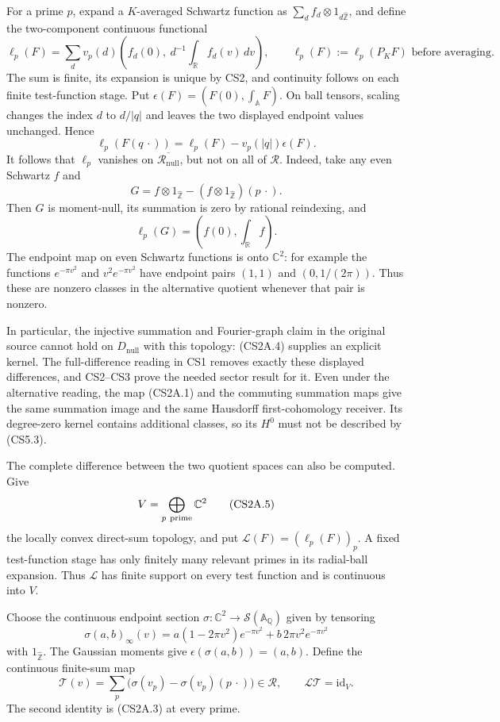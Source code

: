 For a prime \(p\), expand a \(K\)-averaged Schwartz function as
\(\sum_d f_d\otimes1_{d\widehat{\mathbb Z}}\), and define the
two-component continuous functional \[
\ell_p(F)=\sum_d v_p(d)
\left(f_d(0),\ d^{-1}\int_{\mathbb R}f_d(v)\,dv\right),
\qquad \ell_p(F):=\ell_p(P_KF)
\text{ before averaging.}
\tag{CS2A.2}
\] The sum is finite, its expansion is unique by CS2, and continuity
follows on each finite test-function stage. Put
\(\epsilon(F)=(F(0),\int_{\mathbb A}F)\). On ball tensors, scaling
changes the index \(d\) to \(d/|q|\) and leaves the two displayed
endpoint values unchanged. Hence \[
\ell_p(F(q\,\cdot))
=\ell_p(F)-v_p(|q|)\epsilon(F).
\tag{CS2A.3}
\] It follows that \(\ell_p\) vanishes on
\(\overline{\mathcal R_{\mathrm{null}}}\), but not on all of
\(\mathcal R\). Indeed, take any even Schwartz \(f\) and \[
G=f\otimes1_{\widehat{\mathbb Z}}
-(f\otimes1_{\widehat{\mathbb Z}})(p\,\cdot).
\] Then \(G\) is moment-null, its summation is zero by rational
reindexing, and \[
\ell_p(G)=\left(f(0),\int_{\mathbb R}f\right).
\tag{CS2A.4}
\] The endpoint map on even Schwartz functions is onto \(\mathbb C^2\):
for example the functions \(e^{-\pi v^2}\) and \(v^2e^{-\pi v^2}\) have
endpoint pairs \((1,1)\) and \((0,1/(2\pi))\). Thus these are nonzero
classes in the alternative quotient whenever that pair is nonzero.

In particular, the injective summation and Fourier-graph claim in the
original source cannot hold on \(D_{\mathrm{null}}\) with this topology:
(CS2A.4) supplies an explicit kernel. The full-difference reading in CS1
removes exactly these displayed differences, and CS2--CS3 prove the
needed sector result for it. Even under the alternative reading, the map
(CS2A.1) and the commuting summation maps give the same summation image
and the same Hausdorff first-cohomology receiver. Its degree-zero kernel
contains additional classes, so its \(H^0\) must not be described by
(CS5.3).

The complete difference between the two quotient spaces can also be
computed. Give \[
V=\bigoplus_{p\ {\rm prime}}\mathbb C^2
\tag{CS2A.5}
\] the locally convex direct-sum topology, and put
\(\mathscr L(F)=(\ell_p(F))_p\). A fixed test-function stage has only
finitely many relevant primes in its radial-ball expansion. Thus
\(\mathscr L\) has finite support on every test function and is
continuous into \(V\).

Choose the continuous endpoint section
\(\sigma:\mathbb C^2\to\mathcal S(\mathbb A_{\mathbb Q})\) given by
tensoring \[
\sigma(a,b)_\infty(v)
=a(1-2\pi v^2)e^{-\pi v^2}
+b\,2\pi v^2e^{-\pi v^2}
\tag{CS2A.6}
\] with \(1_{\widehat{\mathbb Z}}\). The Gaussian moments give
\(\epsilon(\sigma(a,b))=(a,b)\). Define the continuous finite-sum map \[
\mathscr T(v)=\sum_p
\bigl(\sigma(v_p)-\sigma(v_p)(p\,\cdot)\bigr)
\in\mathcal R,\qquad
\mathscr L\mathscr T=\mathrm{id}_V.
\tag{CS2A.7}
\] The second identity is (CS2A.3) at every prime.


